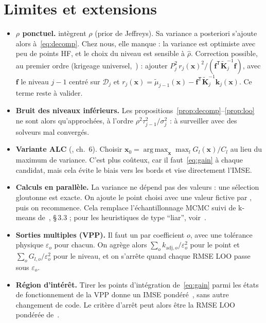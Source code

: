 \documentclass[10pt,a4paper]{article}
\theoremstyle{plain}
\newcommand{\vx}{\bm{x}}
\newcommand{\Kt}{\widetilde{\bm{K}}}
\newcommand{\D}{\mathcal{D}}
\newcommand{\tp}{^{\mathsf{T}}}
\DeclareMathOperator*{\argmax}{arg\,max}
\begin{document}
\section{Limites et extensions}\label{sec:limites}
\begin{itemize}
  \item \textbf{$\rho$ ponctuel.} \cite{LGC15,LGG14} intègrent $\rho$ (prior de Jeffreys). Sa variance
        a posteriori s'ajoute alors à~\eqref{eq:decomp}. Chez nous, elle manque : la variance est optimiste
        avec peu de points HF, et le choix du niveau est sensible à $\hat\rho$. Correction possible, au
        premier ordre (krigeage universel,~\cite[éq.~2.42]{RW06}) : ajouter
        $P_j^2\,r_j(\vx)^2/(\bm{f}\tp\Kt_j^{-1}\bm{f})$, avec $\bm{f}$ le niveau $j-1$ centré sur $\D_j$ et
        $r_j(\vx)=\tilde\mu_{j-1}(\vx)-\bm{f}\tp\Kt_j^{-1}\bm{k}_j(\vx)$. Ce terme reste à valider.
  \item \textbf{Bruit des niveaux inférieurs.} Les propositions~\ref{prop:decomp}–\ref{prop:loo} ne sont
        alors qu'approchées, à l'ordre $\rho^2\tau_{j-1}^2/\sigma_j^2$ : à surveiller avec des solveurs
        mal convergés.
  \item \textbf{Variante ALC} (\cite{Gra20}, ch.~6). Choisir $\vx_0=\argmax_{\vx}\max_l G_l(\vx)/C_l$ au lieu
        du maximum de variance. C'est plus coûteux, car il faut~\eqref{eq:gain} à chaque candidat, mais cela
        évite le biais vers les bords et vise directement l'IMSE.
  \item \textbf{Calculs en parallèle.} La variance ne dépend pas des valeurs : une sélection gloutonne est
        exacte. On ajoute le point choisi avec une valeur fictive par , puis on recommence.
        Cela remplace l'échantillonnage MCMC suivi de k-means de~\cite{LGC15}, §\,3.3 ; pour les heuristiques
        de type \enquote{liar}, voir~\cite{Gin10}.
  \item \textbf{Sorties multiples (VPP).} Il faut un  par coefficient $o$, avec une tolérance
        physique $\varepsilon_o$ pour chacun. On agrège alors $\sum_o k_{\mathrm{adj},o}/\varepsilon_o^2$
        pour le point et $\sum_o G_{l,o}/\varepsilon_o^2$ pour le niveau, et on s'arrête quand chaque RMSE
        LOO passe sous $\varepsilon_o$.
  \item \textbf{Région d'intérêt.} Tirer les points d'intégration de~\eqref{eq:gain} parmi les états de
        fonctionnement de la VPP donne un IMSE pondéré~\cite{Pic10}, sans autre changement de code. Le
        critère d'arrêt peut alors être la RMSE LOO pondérée de~\cite{W21}.
\end{itemize}
\end{document}

